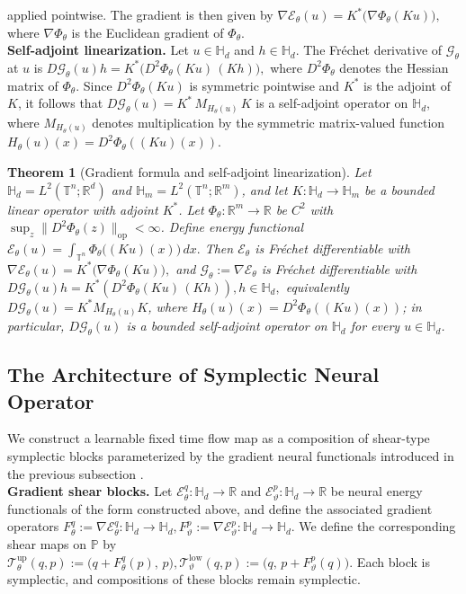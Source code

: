 \documentclass{article}
\theoremstyle{plain}
\newtheorem{theorem}{Theorem}[section]
\theoremstyle{definition}
\theoremstyle{remark}
\newcommand{\Hd}{\mathbb{H}_d}
\newcommand{\Hm}{\mathbb{H}_m}
\begin{document}
      applied pointwise.
The gradient is then given by
\(
\nabla\mathcal{E}_\theta(u)
=
K^*\big( \nabla \Phi_\theta(Ku) \big),
\)
where $\nabla\Phi_\theta$ is the Euclidean gradient of $\Phi_\theta$.\\
\textbf{Self-adjoint linearization.}
Let $u\in\Hd$ and $h\in\Hd$.
The Fréchet derivative of $\mathcal{G}_\theta$ at $u$ is
\(
D\mathcal{G}_\theta(u)h
=
K^* \big( D^2\Phi_\theta(Ku)\, (K h) \big),
\)
where $D^2\Phi_\theta$ denotes the Hessian matrix of $\Phi_\theta$.
Since $D^2\Phi_\theta(Ku)$ is symmetric pointwise and $K^*$ is the adjoint of $K$,
it follows that
\(
D\mathcal{G}_\theta(u)
=
K^*\, M_{H_\theta(u)}\, K
\)
is a self-adjoint operator on $\Hd$,
where $M_{H_\theta(u)}$ denotes multiplication by the symmetric matrix-valued function
$H_\theta(u)(x)=D^2\Phi_\theta((Ku)(x))$.

\begin{theorem}[Gradient formula and self-adjoint linearization]\label{nsafno}
Let $\Hd=L^2(\mathbb{T}^n;\mathbb{R}^d)$ and $\Hm=L^2(\mathbb{T}^n;\mathbb{R}^m)$, and let $K:\Hd\to\Hm$ be a bounded linear operator with adjoint $K^*$. Let $\Phi_\theta:\mathbb{R}^m\to\mathbb{R}$ be $C^2$ with $\sup_{z}\|D^2\Phi_\theta(z)\|_{\mathrm{op}}<\infty$. Define energy functional 
\(
\mathcal{E}_\theta(u)=\int_{\mathbb{T}^n}\Phi_\theta\big((Ku)(x)\big)\,dx.
\)
Then $\mathcal{E}_\theta$ is Fr\'echet differentiable with
\(
\nabla\mathcal{E}_\theta(u)=K^*\big(\nabla\Phi_\theta(Ku)\big),
\)
and $\mathcal{G}_\theta:=\nabla\mathcal{E}_\theta$ is Fr\'echet differentiable with
\(
D\mathcal{G}_\theta(u)h = K^*\!\left(D^2\Phi_\theta(Ku)\,(Kh)\right), h\in\Hd,
\)
equivalently $D\mathcal{G}_\theta(u)=K^* M_{H_\theta(u)} K$, where $H_\theta(u)(x)=D^2\Phi_\theta((Ku)(x))$; in particular, $D\mathcal{G}_\theta(u)$ is a bounded self-adjoint operator on $\Hd$ for every $u\in\Hd$.
\end{theorem}

\subsection{The Architecture of Symplectic Neural Operator}
\label{subsec:arch-sympno}
We construct a learnable fixed time flow map
as a composition of shear-type symplectic blocks parameterized by the gradient neural functionals introduced in the previous subsection
.\\
\textbf{Gradient shear blocks.}
Let $\mathcal{E}^{q}_{\theta}:\Hd\to\mathbb{R}$ and $\mathcal{E}^{p}_{\vartheta}:\Hd\to\mathbb{R}$
be neural energy functionals of the form constructed above, and define the associated
gradient operators
\(
F^{q}_{\theta}:=\nabla \mathcal{E}^{q}_{\theta}:\Hd\to\Hd,
F^{p}_{\vartheta}:=\nabla \mathcal{E}^{p}_{\vartheta}:\Hd\to\Hd.
\)
We define the corresponding shear maps on $\mathbb{P}$ by
\(
\mathcal{T}^{\mathrm{up}}_{\theta}(q,p)
:=
\big(q+F^{q}_{\theta}(p),\,p\big),
\mathcal{T}^{\mathrm{low}}_{\vartheta}(q,p)
:=
\big(q,\,p+F^{p}_{\vartheta}(q)\big).
\)
Each block is symplectic, and compositions of these blocks remain symplectic.
\end{document}
